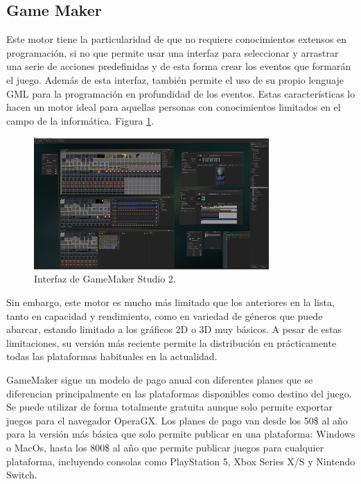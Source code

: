 \subsection{Game Maker}

Este motor tiene la particularidad de que no requiere conocimientos extensos en programación, si no que permite usar una interfaz para seleccionar y arrastrar una serie de acciones predefinidas y de esta forma crear los eventos que formarán el juego. Además de esta interfaz, también permite el uso de su propio lenguaje GML para la programación en profundidad de los eventos. Estas características lo hacen un motor ideal para aquellas personas con conocimientos limitados en el campo de la informática. \cite{EA_engine_gamemaker} Figura \ref{fig:EA_gameMaker}.

\begin{figure}[H]
  \centering
\includegraphics[width=0.8\textwidth]{03.EstudioProblema/01.EstadoArte/00.Figuras/30.interfaz_game_maker.jpg}
    \caption{Interfaz de GameMaker Studio 2. \cite{EA_img_gameMaker}}
    \label{fig:EA_gameMaker}
\end{figure}

Sin embargo, este motor es mucho más limitado que los anteriores en la lista, tanto en capacidad y rendimiento, como en variedad de géneros que puede abarcar, estando limitado a los gráficos 2D o 3D muy básicos. A pesar de estas limitaciones, su versión más reciente permite la distribución en prácticamente todas las plataformas habituales en la actualidad.

GameMaker sigue un modelo de pago anual con diferentes planes que se diferencian principalmente en las plataformas disponibles como destino del juego. Se puede utilizar de forma totalmente gratuita aunque solo permite exportar juegos para el navegador OperaGX. Los planes de pago van desde los 50\$ al año para la versión más básica que solo permite publicar en una plataforma: Windows o MacOs, hasta los 800\$ al año que permite publicar juegos para cualquier plataforma, incluyendo consolas como PlayStation 5, Xbox Series X/S y Nintendo Switch. \cite{EA_engine_gamemakerplanes}

